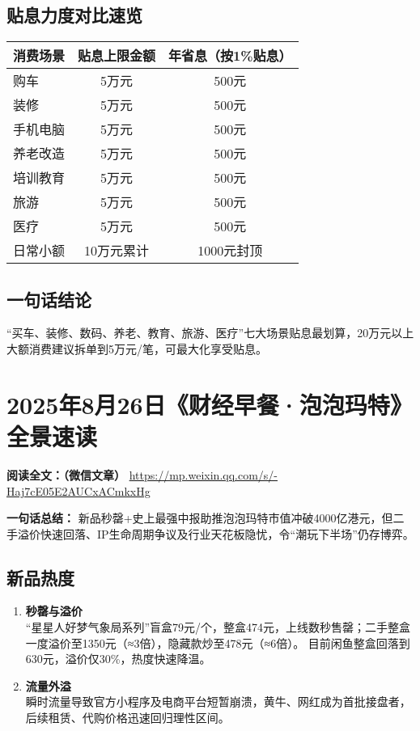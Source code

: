 \subsection{贴息力度对比速览}
\begin{table}[H]
\centering
\begin{tabular}{lcc}
\toprule
消费场景 & 贴息上限金额 & 年省息（按1\%贴息） \\
\midrule
购车 & 5万元 & 500元 \\
装修 & 5万元 & 500元 \\
手机电脑 & 5万元 & 500元 \\
养老改造 & 5万元 & 500元 \\
培训教育 & 5万元 & 500元 \\
旅游 & 5万元 & 500元 \\
医疗 & 5万元 & 500元 \\
日常小额 & 10万元累计 & 1000元封顶 \\
\bottomrule
\end{tabular}
\end{table}

\subsection{一句话结论}
“买车、装修、数码、养老、教育、旅游、医疗”七大场景贴息最划算，20万元以上大额消费建议拆单到5万元/笔，可最大化享受贴息。


\section{2025年8月26日《财经早餐·泡泡玛特》全景速读}
\vspace{1cm}
\noindent\textbf{阅读全文：（微信文章）} \url{https://mp.weixin.qq.com/s/-Haj7cE05E2AUCxACmkxHg}

\textbf{一句话总结：}  
新品秒罄+史上最强中报助推泡泡玛特市值冲破4000亿港元，但二手溢价快速回落、IP生命周期争议及行业天花板隐忧，令“潮玩下半场”仍存博弈。

\subsection{新品热度}
\begin{enumerate}[leftmargin=*, nosep]
    \item \textbf{秒罄与溢价}  \\
    “星星人好梦气象局系列”盲盒79元/个，整盒474元，上线数秒售罄；二手整盒一度溢价至1350元（≈3倍），隐藏款炒至478元（≈6倍）。  
    目前闲鱼整盒回落到630元，溢价仅30\%，热度快速降温。
    \item \textbf{流量外溢}  \\
    瞬时流量导致官方小程序及电商平台短暂崩溃，黄牛、网红成为首批接盘者，后续租赁、代购价格迅速回归理性区间。
\end{enumerate}

